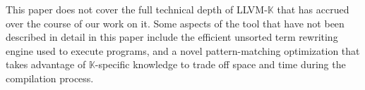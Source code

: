 \documentclass{article}
\theoremstyle{definition}
\newcommand{\K}{$\mathbb{K}$\xspace}
\newcommand{\KL}{LLVM-\K}
\begin{document}
This paper does not cover the full technical depth of \KL that has accrued over the course of our work on it. Some aspects of the tool that have not been described in detail in this paper include the efficient unsorted term rewriting engine used to execute programs, and a novel pattern-matching optimization that takes advantage of \K-specific knowledge to trade off space and time during the compilation process.

\clearpage

\end{document}
